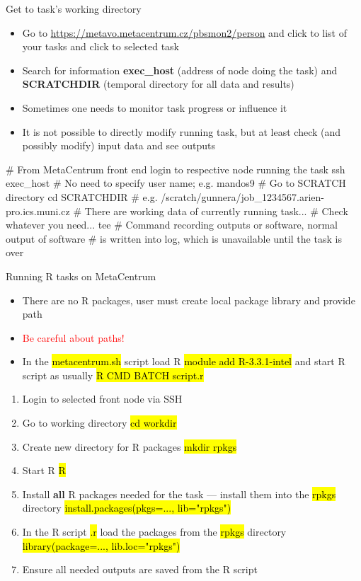 \documentclass[compress, ucs, xelatex, 11pt, xcolor=svgnames,
  hyperref={
    bookmarks=true,
    unicode=true,
    colorlinks=true,
    pdftitle={Linux, command line and MetaCentrum},
    plainpages=false,
    pdfauthor={Vojtech Zeisek},
    pdfsubject={Course about use of Linux command line, writing shell scripts and using MetaCentrum of CESNET},
    pdfcreator={XeLaTeX},
    pdfkeywords={Linux, GNU, BASH, shell, command line, MetaCentrum},
    linkcolor=DarkRed,
    anchorcolor=DarkBlue,
    citecolor=Indigo,
    filecolor=NavyBlue,
    menucolor=DarkMagenta,
    urlcolor=DarkBlue,
    pdftex},
  url={hyphens, lowtilde} %
  ]{beamer}
\renewcommand{\texttt}[1]{\hl{\ttfamily #1}}
\renewcommand{\alert}[1]{\textcolor{red}{#1}}
\begin{document}
\begin{frame}[fragile]{Get to task's working directory}
  \begin{itemize}
    \item Go to \url{https://metavo.metacentrum.cz/pbsmon2/person} and click to list of your tasks and click to selected task
    \item Search for information \textbf{exec\_host} (address of node doing the task) and \textbf{SCRATCHDIR} (temporal directory for all data and results)
    \item Sometimes one needs to monitor task progress or influence it
    \item It is not possible to directly modify running task, but at least check (and possibly modify) input data and see outputs
  \end{itemize}
  \begin{bashcode}
    # From MetaCentrum front end login to respective node running the task
    ssh exec_host # No need to specify user name; e.g. mandos9
    # Go to SCRATCH directory
    cd SCRATCHDIR # e.g. /scratch/gunnera/job_1234567.arien-pro.ics.muni.cz
    # There are working data of currently running task...
    # Check whatever you need...
    tee # Command recording outputs or software, normal output of software
        # is written into log, which is unavailable until the task is over
  \end{bashcode}
\end{frame}

\begin{frame}{Running R tasks on MetaCentrum}
  \begin{itemize}
    \item There are no R packages, user must create local package library and provide path
    \item \alert{Be careful about paths!}
    \item In the \texttt{metacentrum.sh} script load R \texttt{module add R-3.3.1-intel} and start R script as usually \texttt{R CMD BATCH script.r}
  \end{itemize}
  \begin{enumerate}
    \item Login to selected front node via SSH
    \item Go to working directory \texttt{cd workdir}
    \item Create new directory for R packages \texttt{mkdir rpkgs}
    \item Start R \texttt{R}
    \item Install \textbf{all} R packages needed for the task --- install them into the \texttt{rpkgs} directory \texttt{install.packages(pkgs=..., lib="rpkgs")}
    \item In the R script \texttt{*.r} load the packages from the \texttt{rpkgs} directory \texttt{library(package=..., lib.loc="rpkgs")}
    \item Ensure all needed outputs are saved from the R script
  \end{enumerate}
\end{frame}
\end{document}
